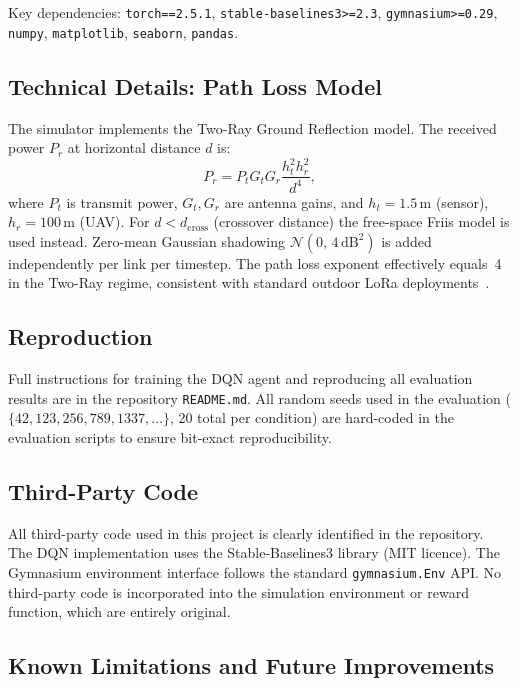 \noindent Key dependencies: \texttt{torch==2.5.1}, \texttt{stable-baselines3>=2.3}, \texttt{gymnasium>=0.29}, \texttt{numpy}, \texttt{matplotlib}, \texttt{seaborn}, \texttt{pandas}.

\subsection*{Technical Details: Path Loss Model}

The simulator implements the Two-Ray Ground Reflection model. The received power $P_r$ at horizontal distance $d$ is:
\begin{equation}
P_r = P_t G_t G_r \frac{h_t^2 h_r^2}{d^4},
\label{eq:two_ray}
\end{equation}
where $P_t$ is transmit power, $G_t, G_r$ are antenna gains, and $h_t = 1.5$\,m (sensor), $h_r = 100$\,m (UAV). For $d < d_\text{cross}$ (crossover distance) the free-space Friis model is used instead. Zero-mean Gaussian shadowing $\mathcal{N}(0,\,4\,\text{dB}^2)$ is added independently per link per timestep. The path loss exponent effectively equals~4 in the Two-Ray regime, consistent with standard outdoor LoRa deployments~\cite{alhourani2014optimal}.

\subsection*{Reproduction}

Full instructions for training the DQN agent and reproducing all evaluation results are in the repository \texttt{README.md}. All random seeds used in the evaluation ($\{42, 123, 256, 789, 1337, \ldots\}$, 20 total per condition) are hard-coded in the evaluation scripts to ensure bit-exact reproducibility.

\subsection*{Third-Party Code}

All third-party code used in this project is clearly identified in the repository. The DQN implementation uses the Stable-Baselines3 library (MIT licence). The Gymnasium environment interface follows the standard \texttt{gymnasium.Env} API. No third-party code is incorporated into the simulation environment or reward function, which are entirely original.

\subsection*{Known Limitations and Future Improvements}


